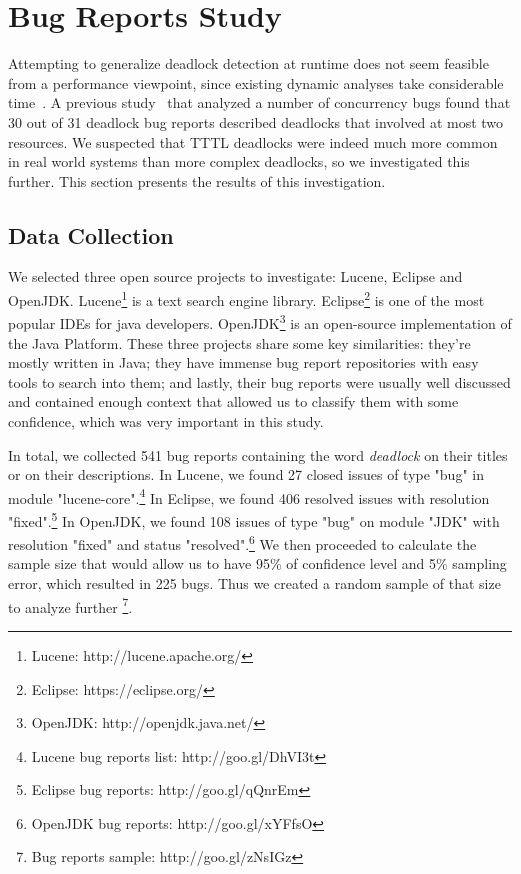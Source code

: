 \section{Bug Reports Study}\label{bugs}

Attempting to generalize deadlock detection at runtime does not seem feasible from a performance viewpoint, since existing dynamic analyses take considerable time~\cite{magicfuzzer}. A previous study~\cite{lu} that analyzed a number of concurrency bugs found that 30 out of 31 deadlock bug reports described deadlocks that involved at most two resources. We suspected that TTTL deadlocks were indeed much more common in real world systems than more complex deadlocks, so we investigated this further. This section presents the results of this investigation. 

\subsection{Data Collection}

We selected three open source projects to investigate: Lucene, Eclipse and OpenJDK. Lucene\footnote{Lucene: http://lucene.apache.org/} is a text search engine library. Eclipse\footnote{Eclipse: https://eclipse.org/} is one of the most popular IDEs for java developers. OpenJDK\footnote{OpenJDK: http://openjdk.java.net/} is an open-source implementation of the Java Platform. These three projects share some key similarities: they're mostly written in Java; they have immense bug report repositories with easy tools to search into them; and lastly, their bug reports were usually well discussed and contained enough context that allowed us to classify them with some confidence, which was very important in this study.

In total, we collected 541 bug reports containing the word \emph{deadlock} on their titles or on their descriptions. In Lucene, we found 27 closed issues of type "bug" in module "lucene-core".\footnote{Lucene bug reports list: http://goo.gl/DhVI3t}
In Eclipse, we found 406 resolved issues with resolution "fixed".\footnote{Eclipse bug reports: http://goo.gl/qQnrEm}
In OpenJDK, we found 108 issues of type "bug" on module "JDK" with resolution "fixed" and status "resolved".\footnote{OpenJDK bug reports: http://goo.gl/xYFfsO} We then proceeded to calculate the sample size that would allow us to have 95\% of confidence level and 5\% sampling error,  which resulted in 225 bugs. Thus we created a random sample of that size to analyze further \footnote{Bug reports sample: http://goo.gl/zNsIGz}.

